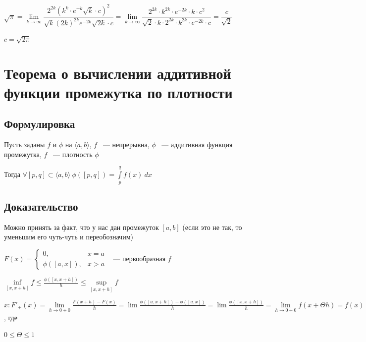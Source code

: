 \documentclass{article}
\begin{document}
            $\sqrt{\pi} = \lim\limits_{k \rightarrow \infty} \dfrac{2^{2k} (k^k \cdot e^{-k} \sqrt{k} \cdot c)^2}{\sqrt{k} (2k)^{2k} e^{-2k} \sqrt{2k} \cdot c} = \lim\limits_{k \rightarrow \infty} \dfrac{2^{2k} \cdot k^{2k} \cdot e^{-2k} \cdot k \cdot c^2}{\sqrt{2} \cdot k \cdot 2^{2k} \cdot k^{2k} \cdot e^{-2k} \cdot c} = \dfrac{c}{\sqrt{2}}$
            
            $c = \sqrt{2 \pi}$
            
    \newpage
    
    \section{Теорема о вычислении аддитивной функции промежутка по плотности}
    
        \subsection{Формулировка}
        
            Пусть заданы $f$ и $\phi$ на $\langle a, b \rangle$, $f$ ~--- непрерывна, $\phi$ ~--- аддитивная функция промежутка, $f$ ~--- плотность $\phi$
            
            Тогда $\forall [p, q] \subset \langle a, b \rangle \ \phi([p, q]) = \int\limits^q_p f(x) \ dx$
            
        \subsection{Доказательство}
        
            Можно принять за факт, что у нас дан промежуток $[a, b]$ (если это не так, то уменьшим его чуть-чуть и переобозначим)
            
            $F(x) = \begin{cases} 0{,} & x = a \\ \phi([a, x]){,} & x > a \end{cases}$ ~--- первообразная $f$
            
            $\inf\limits_{[x, x + h]} f \leq \frac{\phi([x, x + h])}{h} \leq \sup\limits_{[x, x + h]} f$
            
            $x : F'_+(x) = \lim\limits_{h \rightarrow 0 + 0} \frac{F(x + h) - F(x)}{h} = \lim \frac{\phi([a, x + h]) - \phi([a, x])}{h} = \lim \frac{\phi([x, x + h])}{h} = \lim\limits_{h \rightarrow 0 + 0} f(x + \Theta h) = f(x)$, где
            
            $0 \leq \Theta \leq 1$
            
\end{document}
